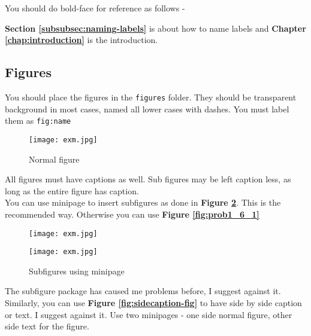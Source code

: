 You should do bold-face for reference as follows -

\textbf{Section \ref{subsubsec:naming-labels}} is about how to name labels and \textbf{Chapter \ref{chap:introduction}} is the introduction.

\subsection{Figures}

You should place the figures in the \texttt{figures} folder. They should be transparent background in most cases, named all lower cases with dashes. You must label them as \texttt{fig:name}\\

\begin{figure}[!hbt]
  	\centering
 	\texttt{[image: exm.jpg]}
  	\caption{Normal figure}
 	\label{fig:normal-figure}
\end{figure}

All figures must have captions as well. Sub figures may be left caption less, as long as the entire figure has caption.\\

You can use minipage to insert subfigures as done in \textbf{Figure \ref{fig:subfig-minipage}}. This is the recommended way. Otherwise you can use \textbf{Figure \ref{fig:prob1_6_1}}\\

\begin{figure}[!htb]
    \centering
    \begin{minipage}{.5\textwidth}
        \centering
        \texttt{[image: exm.jpg]}
        \caption{$dt=0.1$}
        \label{fig:prob1_6_2}
    \end{minipage}%
    \begin{minipage}{0.5\textwidth}
        \centering
        \texttt{[image: exm.jpg]}
        \caption{$dt =$}
        \label{fig:prob1_6_1}
    \end{minipage}
    \caption{Subfigures using minipage}
    \label{fig:subfig-minipage}
\end{figure}

The subfigure package has caused me problems before, I suggest against it. Similarly, you can use \textbf{Figure \ref{fig:sidecaption-fig}} to have side by side caption or text. I suggest against it. Use two minipages - one side normal figure, other side text for the figure.

